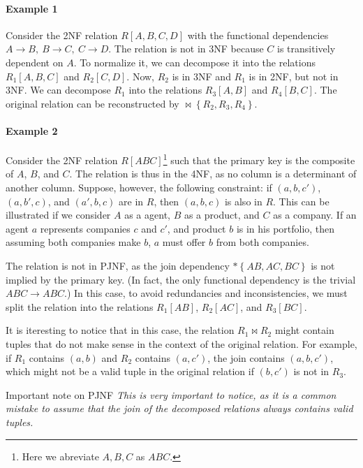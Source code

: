 \paragraph{Example 1}  Consider the 2NF relation $R[A, B, C, D]$ with the functional
dependencies $A \to B,~B \to C,~C \to D$.  The relation is not in 3NF because $C$ is
transitively dependent on $A$.  To normalize it, we can decompose it into the
relations $R_1[A, B, C]$ and $R_2[C, D]$.  Now, $R_2$ is in 3NF and $R_1$ is in 2NF, but
not in 3NF.  We can decompose $R_1$ into the relations $R_3[A, B]$ and $R_4[B, C]$.
The original relation can be reconstructed by $\bowtie \left\{ R_2, R_3, R_4 \right\}$.

\paragraph{Example 2} Consider the 2NF relation $R[ABC]$\footnote{Here we abreviate ${A,
B, C}$ as $ABC$.} such that the primary key is the composite of $A$, $B$, and $C$.  The
relation is thus in the 4NF, as no column is a determinant of another column.  Suppose,
however, the following constraint: if $(a, b, c')$, $(a, b', c)$, and $(a', b, c)$ are in
$R$, then $(a, b, c)$ is also in $R$.  This can be illustrated if we consider $A$ as a
agent, $B$ as a product, and $C$ as a company.  If an agent $a$ represents companies $c$ and
$c'$, and product $b$ is in his portfolio, then assuming both companies make $b$, $a$
must offer $b$ from both companies.

The relation is not in PJNF, as the join dependency $* \left\{ AB, AC, BC \right\}$ is not
implied by the primary key.  (In fact, the only functional dependency is the trivial $ABC
\to ABC$.)  In this case, to avoid redundancies and inconsistencies, we must split the
relation into the relations $R_1[AB]$, $R_2[AC]$, and $R_3[BC]$.

It is iteresting to notice that in this case, the relation $R_1 \bowtie R_2$ might
contain tuples that do not make sense in the context of the original relation.  For
example, if $R_1$ contains $(a, b)$ and $R_2$ contains $(a, c')$, the join contains
$(a, b, c')$, which might not be a valid tuple in the original relation if $(b, c')$ is
not in $R_3$.

\begin{hlbox}{Important note on PJNF}
  \em
  This is very important to notice, as it is a common mistake to assume
  that the join of the decomposed relations always contains valid tuples.
\end{hlbox}

